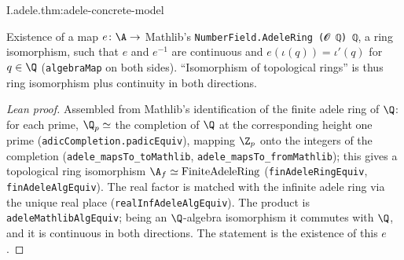 \begin{theorem}
\end{theorem}
\begin{tfformal}{I.adele.thm:adele-concrete-model}
\begin{tffidelity}
Existence of a map $e\colon\A\to$ Mathlib's \texttt{NumberField.AdeleRing (𝓞 ℚ) ℚ}, a ring isomorphism, such that $e$ and $e^{-1}$ are continuous and $e(\iota(q))=\iota'(q)$ for $q\in\Q$ (\texttt{algebraMap} on both sides). ``Isomorphism of topological rings'' is thus ring isomorphism plus continuity in both directions.
\end{tffidelity}
\end{tfformal}
\begin{proof}[Lean proof]
Assembled from Mathlib's identification of the finite adele ring of $\Q$: for each prime, $\Q_p\simeq$ the completion of $\Q$ at the corresponding height one prime (\texttt{adicCompletion.padicEquiv}), mapping $\Z_p$ onto the integers of the completion (\texttt{adele\_mapsTo\_toMathlib}, \texttt{adele\_mapsTo\_fromMathlib}); this gives a topological ring isomorphism $\A_f\simeq\mathrm{FiniteAdeleRing}$ (\texttt{finAdeleRingEquiv}, \texttt{finAdeleAlgEquiv}). The real factor is matched with the infinite adele ring via the unique real place (\texttt{realInfAdeleAlgEquiv}). The product is \texttt{adeleMathlibAlgEquiv}; being an $\Q$-algebra isomorphism it commutes with $\Q$, and it is continuous in both directions. The statement is the existence of this $e$.
\end{proof}

